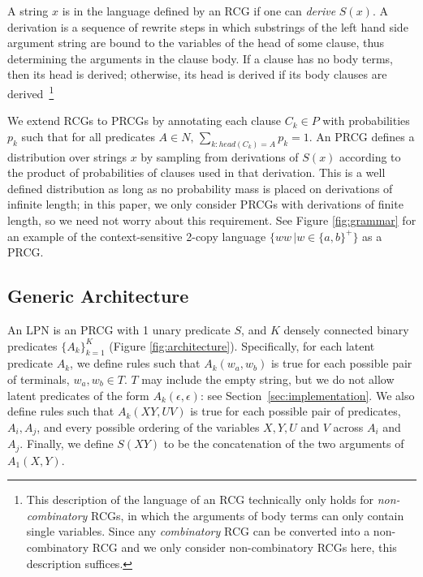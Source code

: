 \documentclass[10pt, twocolumn]{article}
\begin{document}
A string $x$ is in the language defined by an RCG if one can
\emph{derive} $S(x)$. A derivation is a sequence of rewrite steps in
which substrings of the left hand side argument string are bound to
the variables of the head of some clause, thus determining the
arguments in the clause body. If a clause has no body terms, then its
head is derived; otherwise, its head is derived if its body clauses
are derived~\footnote{This description of the language of an RCG
  technically only holds for \emph{non-combinatory} RCGs, in which the
  arguments of body terms can only contain single variables. Since any
  \emph{combinatory} RCG can be converted into a non-combinatory RCG
  and we only consider non-combinatory RCGs here, this description
  suffices.}

We extend RCGs to PRCGs by annotating each clause $C_k \in P$ with
probabilities $p_k$ such that for all predicates ${A \in N, \,
  \sum_{k:head(C_k)=A} p_k = 1}$. An PRCG defines a distribution over
strings $x$ by sampling from derivations of $S(x)$ according to the
product of probabilities of clauses used in that derivation. This is a
well defined distribution as long as no probability mass is placed on
derivations of infinite length; in this paper, we only consider PRCGs
with derivations of finite length, so we need not worry about this
requirement. See Figure \ref{fig:grammar} for an example of the context-sensitive 2-copy language $\{ww\,|w \in \{a,b\}^+\}$ as a PRCG.

\subsection{Generic Architecture}

An LPN is an PRCG with 1 unary predicate $S$, and $K$ densely
connected binary predicates $\{A_k\}_{k=1}^K$ (Figure
\ref{fig:architecture}). Specifically, for each latent predicate
$A_k$, we define rules such that $A_k(w_a,w_b)$ is true for each
possible pair of terminals, $w_a,w_b \in T$. $T$ may include the empty
string, but we do not allow latent predicates of the form
$A_k(\epsilon, \epsilon)$: see Section~\ref{sec:implementation}. We also define rules such that $A_k(XY,UV)$
is true for each possible pair of predicates, $A_i,A_j$, and every
possible ordering of the variables $X,Y,U$ and $V$ across $A_i$ and
$A_j$. Finally, we define $S(XY)$ to be the concatenation of the two
arguments of $A_1(X,Y)$.
 
\end{document}
